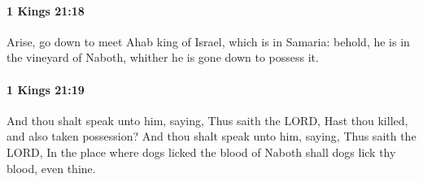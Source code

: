 		\paragraph{1 Kings 21:18} %
			\label{1KINGS-21-18}

			Arise, go down to meet Ahab king of Israel, which is in Samaria: behold, he is in the vineyard of Naboth, whither he is gone down to possess it.


		\paragraph{1 Kings 21:19} %
			\label{1KINGS-21-19}

			And thou shalt speak unto him, saying, Thus saith the LORD, Hast thou killed, and also taken possession? And thou shalt speak unto him, saying, Thus saith the LORD, In the place where dogs licked the blood of Naboth shall dogs lick thy blood, even thine.

